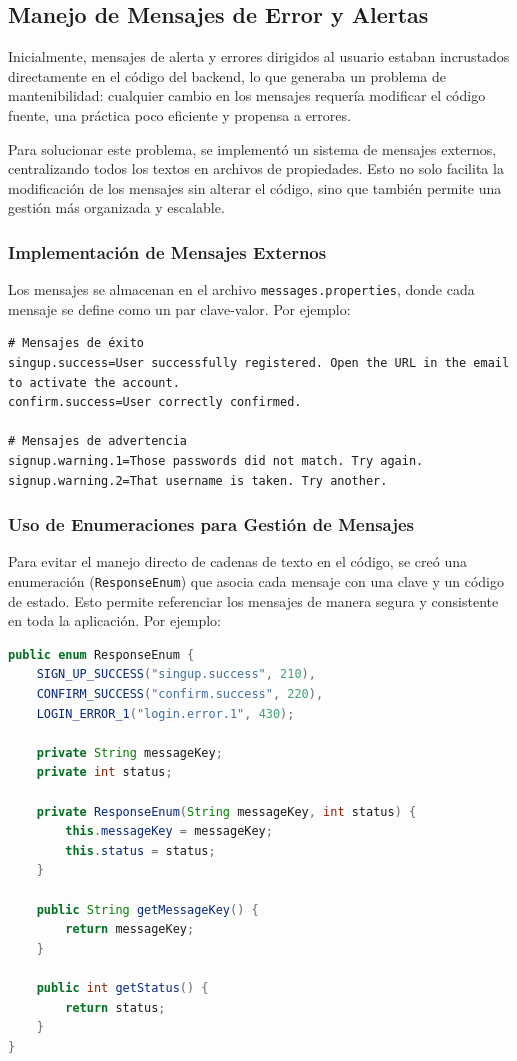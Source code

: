 \documentclass[draft]{scrbook}
\begin{document}
\subsection{Manejo de Mensajes de Error y Alertas}
\label{subsec:alert-messages-backend}

Inicialmente, mensajes de alerta y errores dirigidos al usuario estaban incrustados directamente en el código del backend, lo que generaba un problema de mantenibilidad: cualquier cambio en los mensajes requería modificar el código fuente, una práctica poco eficiente y propensa a errores.

Para solucionar este problema, se implementó un sistema de mensajes externos, centralizando todos los textos en archivos de propiedades. Esto no solo facilita la modificación de los mensajes sin alterar el código, sino que también permite una gestión más organizada y escalable.

\subsubsection{Implementación de Mensajes Externos}

Los mensajes se almacenan en el archivo \texttt{messages.properties}, donde cada mensaje se define como un par clave-valor. Por ejemplo:

\begin{lstlisting}
# Mensajes de éxito
singup.success=User successfully registered. Open the URL in the email to activate the account.
confirm.success=User correctly confirmed.

# Mensajes de advertencia
signup.warning.1=Those passwords did not match. Try again.
signup.warning.2=That username is taken. Try another.

\end{lstlisting}

\subsubsection{Uso de Enumeraciones para Gestión de Mensajes}

Para evitar el manejo directo de cadenas de texto en el código, se creó una enumeración (\texttt{ResponseEnum}) que asocia cada mensaje con una clave y un código de estado. Esto permite referenciar los mensajes de manera segura y consistente en toda la aplicación. Por ejemplo:

\begin{lstlisting}[language=Java]
public enum ResponseEnum {
    SIGN_UP_SUCCESS("singup.success", 210),
    CONFIRM_SUCCESS("confirm.success", 220),
    LOGIN_ERROR_1("login.error.1", 430);

    private String messageKey;
    private int status;

    private ResponseEnum(String messageKey, int status) {
        this.messageKey = messageKey;
        this.status = status;
    }

    public String getMessageKey() {
        return messageKey;
    }

    public int getStatus() {
        return status;
    }
}
\end{lstlisting}
\end{document}
